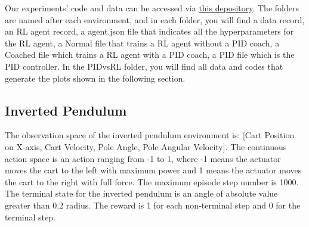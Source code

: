\documentclass{IJCAS}
\begin{document}
Our experiments' code and data can be accessed via \href{https://github.com/BaiLiping/Coaching}{this depository}. The folders are named after each environment, and in each folder, you will find a data record, an RL agent record, a agent.json file that indicates all the hyperparameters for the RL agent, a Normal file that trains a RL agent without a PID coach, a Coached file which trains a RL agent with a PID coach, a PID file which is the PID controller. In the PIDvsRL folder, you will find all data and codes that generate the plots shown in the following section.

\subsection{Inverted Pendulum}
The observation space of the inverted pendulum environment is: [Cart Position on X-axis, Cart Velocity, Pole Angle, Pole Angular Velocity]. The continuous action space is an action ranging from -1 to 1, where -1 means the actuator moves the cart to the left with maximum power and 1 means the actuator moves the cart to the right with full force. The maximum episode step number is 1000. The terminal state for the inverted pendulum is an angle of absolute value greater than 0.2 radius. The reward is 1 for each non-terminal step and 0 for the terminal step. 
\end{document}
